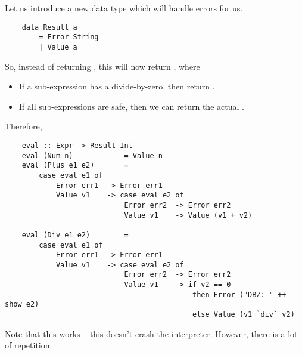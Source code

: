 \documentclass[letterpaper]{article}
\begin{document}
Let us introduce a new data type which will handle errors for us.
\begin{verbatim}
    data Result a
        = Error String 
        | Value a \end{verbatim}
So, instead of returning , this will now return , where 
\begin{itemize}
    \item If a sub-expression has a divide-by-zero, then return .
    \item If all sub-expressions are safe, then we can return the actual .
\end{itemize}
Therefore, 
\begin{verbatim}
    eval :: Expr -> Result Int 
    eval (Num n)            = Value n 
    eval (Plus e1 e2)       = 
        case eval e1 of 
            Error err1  -> Error err1 
            Value v1    -> case eval e2 of 
                            Error err2  -> Error err2 
                            Value v1    -> Value (v1 + v2)
    
    eval (Div e1 e2)        = 
        case eval e1 of 
            Error err1  -> Error err1 
            Value v1    -> case eval e2 of 
                            Error err2  -> Error err2 
                            Value v1    -> if v2 == 0 
                                            then Error ("DBZ: " ++ show e2)
                                            else Value (v1 `div` v2)\end{verbatim}

Note that this works -- this doesn't crash the interpreter. However, there is a lot of repetition. 
\end{document}
